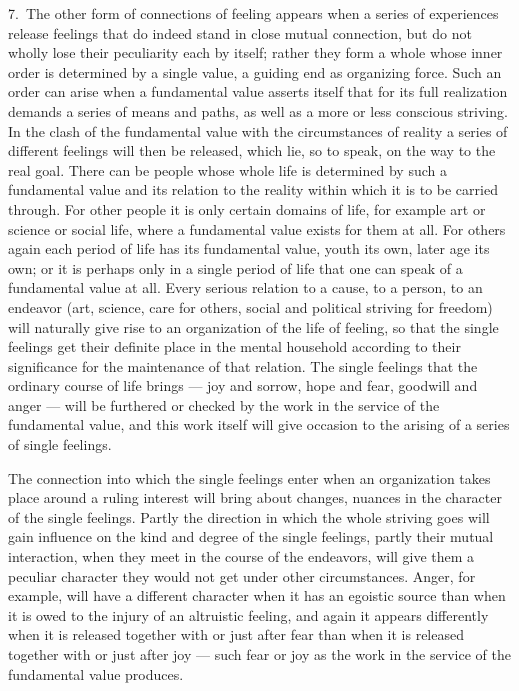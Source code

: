\documentclass[12pt]{book}
\newcommand{\opage}[1]{\marginnote{\footnotesize\textit{[#1]}}}
\begin{document}
7.~The other form of connections of feeling appears when a series of
experiences release feelings that do indeed stand in close mutual connection,
but do not wholly lose their peculiarity each by itself; rather they form a whole
whose inner order is determined by a single value, a guiding end as organizing
force. Such an order can arise when a fundamental value asserts itself that for
its full realization demands a series of means and paths, as well as a more or
less conscious striving. In the clash of the fundamental value with the
circumstances of reality a series of different feelings will then be released,
which lie, so to speak, on the way to the real goal. There can be people whose
whole life is determined by such a fundamental value and its relation to the
reality within which it is to be carried through. For other people it is only
certain domains of life, for example art or science or social life, where a
fundamental value exists for them at all. For others again each period of life
has its fundamental value, youth its own, later age its own; or it is perhaps only
in a single period of life that one can speak of a fundamental value at all. Every
serious relation to a cause, to a person, to an endeavor (art, science, care for
others, social and political striving for freedom) will naturally give rise to an
organization of the life of feeling, so that the \opage{31}single feelings get
their definite place in the mental household according to their significance for
the maintenance of that relation. The single feelings that the ordinary course of
life brings --- joy and sorrow, hope and fear, goodwill and anger --- will be
furthered or checked by the work in the service of the fundamental value, and
this work itself will give occasion to the arising of a series of single
feelings.

The connection into which the single feelings enter when an organization takes
place around a ruling interest will bring about changes, nuances in the character
of the single feelings. Partly the direction in which the whole striving goes
will gain influence on the kind and degree of the single feelings, partly their
mutual interaction, when they meet in the course of the endeavors, will give them
a peculiar character they would not get under other circumstances. Anger, for
example, will have a different character when it has an egoistic source than when
it is owed to the injury of an altruistic feeling, and again it appears
differently when it is released together with or just after fear than when it is
released together with or just after joy --- such fear or joy as the work in the
service of the fundamental value produces.
\end{document}
